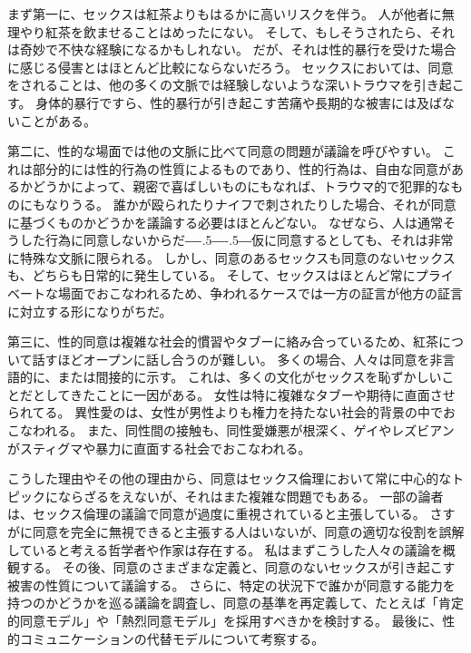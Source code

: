\documentclass[paper=a4,book,openany]{jlreq}
\def\DDASH{―\kern-.5\zw―\kern-.5\zw―} %
\begin{document}
まず第一に、セックスは紅茶よりもはるかに高いリスクを伴う。
人が他者に無理やり紅茶を飲ませることはめったにない。
そして、もしそうされたら、それは奇妙で不快な経験になるかもしれない。
だが、それは性的暴行を受けた場合に感じる侵害とはほとんど比較にならないだろう。
セックスにおいては、同意をされることは、他の多くの文脈では経験しないような深いトラウマを引き起こす。
身体的暴行ですら、性的暴行が引き起こす苦痛や長期的な被害には及ばないことがある。

第二に、性的な場面では他の文脈に比べて同意の問題が議論を呼びやすい。
これは部分的には性的行為の性質によるものであり、性的行為は、自由な同意があるかどうかによって、親密で喜ばしいものにもなれば、トラウマ的で犯罪的なものにもなりうる。
誰かが殴られたりナイフで刺されたりした場合、それが同意に基づくものかどうかを議論する必要はほとんどない。
なぜなら、人は通常そうした行為に同意しないからだ{\DDASH}仮に同意するとしても、それは非常に特殊な文脈に限られる。
しかし、同意のあるセックスも同意のないセックスも、どちらも日常的に発生している。
そして、セックスはほとんど常にプライベートな場面でおこなわれるため、争われるケースでは一方の証言が他方の証言に対立する形になりがちだ。

第三に、性的同意は複雑な社会的慣習やタブーに絡み合っているため、紅茶について話すほどオープンに話し合うのが難しい。
多くの場合、人々は同意を非言語的に、または間接的に示す。
これは、多くの文化がセックスを恥ずかしいことだとしてきたことに一因がある。
女性は特に複雑なタブーや期待に直面させられてる。
異性愛のは、女性が男性よりも権力を持たない社会的背景の中でおこなわれる。
また、同性間の接触も、同性愛嫌悪が根深く、ゲイやレズビアンがスティグマや暴力に直面する社会でおこなわれる。

こうした理由やその他の理由から、同意はセックス倫理において常に中心的なトピックにならざるをえないが、それはまた複雑な問題でもある。
一部の論者は、セックス倫理の議論で同意が過度に重視されていると主張している。
さすがに同意を完全に無視できると主張する人はいないが、同意の適切な役割を誤解していると考える哲学者や作家は存在する。
私はまずこうした人々の議論を概観する。
その後、同意のさまざまな定義と、同意のないセックスが引き起こす被害の性質について議論する。
さらに、特定の状況下で誰かが同意する能力を持つのかどうかを巡る議論を調査し、同意の基準を再定義して、たとえば「肯定的同意モデル」や「熱烈同意モデル」を採用すべきかを検討する。
最後に、性的コミュニケーションの代替モデルについて考察する。
\end{document}
